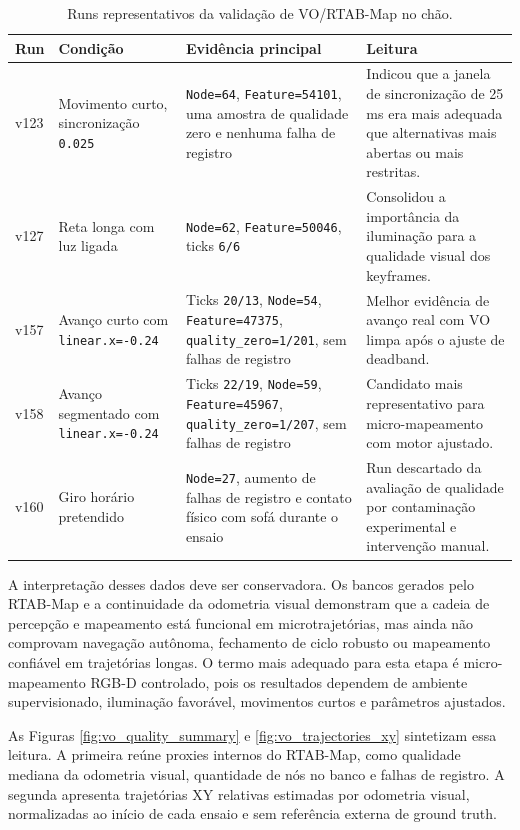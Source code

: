 \begin{table}[H]
\centering
\caption{Runs representativos da validação de VO/RTAB-Map no chão.}
\label{tab:vo-rtabmap-runs}
\begin{tabularx}{\textwidth}{p{1.4cm} p{3.4cm} p{4.0cm} X}
\hline
\textbf{Run} & \textbf{Condição} & \textbf{Evidência principal} & \textbf{Leitura} \\
\hline
v123 & Movimento curto, sincronização \texttt{0.025} & \texttt{Node=64}, \texttt{Feature=54101}, uma amostra de qualidade zero e nenhuma falha de registro & Indicou que a janela de sincronização de 25 ms era mais adequada que alternativas mais abertas ou mais restritas. \\
v127 & Reta longa com luz ligada & \texttt{Node=62}, \texttt{Feature=50046}, ticks \texttt{6/6} & Consolidou a importância da iluminação para a qualidade visual dos keyframes. \\
v157 & Avanço curto com \texttt{linear.x=-0.24} & Ticks \texttt{20/13}, \texttt{Node=54}, \texttt{Feature=47375}, \texttt{quality\_zero=1/201}, sem falhas de registro & Melhor evidência de avanço real com VO limpa após o ajuste de deadband. \\
v158 & Avanço segmentado com \texttt{linear.x=-0.24} & Ticks \texttt{22/19}, \texttt{Node=59}, \texttt{Feature=45967}, \texttt{quality\_zero=1/207}, sem falhas de registro & Candidato mais representativo para micro-mapeamento com motor ajustado. \\
v160 & Giro horário pretendido & \texttt{Node=27}, aumento de falhas de registro e contato físico com sofá durante o ensaio & Run descartado da avaliação de qualidade por contaminação experimental e intervenção manual. \\
\hline
\end{tabularx}
\end{table}

A interpretação desses dados deve ser conservadora. Os bancos gerados pelo RTAB-Map e a continuidade da odometria visual demonstram que a cadeia de percepção e mapeamento está funcional em microtrajetórias, mas ainda não comprovam navegação autônoma, fechamento de ciclo robusto ou mapeamento confiável em trajetórias longas. O termo mais adequado para esta etapa é micro-mapeamento RGB-D controlado, pois os resultados dependem de ambiente supervisionado, iluminação favorável, movimentos curtos e parâmetros ajustados.

As Figuras \ref{fig:vo_quality_summary} e \ref{fig:vo_trajectories_xy} sintetizam essa leitura. A primeira reúne proxies internos do RTAB-Map, como qualidade mediana da odometria visual, quantidade de nós no banco e falhas de registro. A segunda apresenta trajetórias XY relativas estimadas por odometria visual, normalizadas ao início de cada ensaio e sem referência externa de ground truth.


